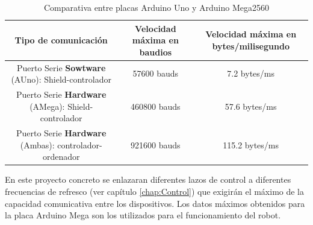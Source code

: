 	 \begin{table}[H]
	 	\caption{Comparativa entre placas Arduino Uno y Arduino Mega2560}
	 	\label{tab:comunication_serial}
	 		\begin{center}
	 			\begin{tabular}{ |c|c|c| }
	 				\hline
	 				\textbf{Tipo de comunicación}& \begin{minipage}{.30\linewidth} \textbf{Velocidad máxima  en baudios}  \end{minipage}& \begin{minipage}{.30\linewidth} \textbf{Velocidad máxima en bytes/milisegundo} \end{minipage} \\
	 				\hline
	 				\begin{minipage}{.30\linewidth}\vspace{2pt} Puerto Serie \textbf{Sowtware} (AUno):  Shield-controlador \vspace{2pt} \end{minipage} & 57600 bauds & 7.2 bytes/ms \\
	 				\hline
	 				\begin{minipage}{.30\linewidth}\vspace{2pt} Puerto Serie \textbf{Hardware} (AMega):  Shield-controlador \vspace{2pt} \end{minipage} & 460800 bauds & 57.6 bytes/ms \\
	 				\hline
	 				\begin{minipage}{.30\linewidth}\vspace{2pt} Puerto Serie \textbf{Hardware} (Ambas):  controlador-ordenador \vspace{2pt} \end{minipage} & 921600 bauds & 115.2 bytes/ms \\
	 				\hline
	 			\end{tabular}
	 		\end{center}
	 \end{table}
	 
	 En este proyecto concreto se enlazaran diferentes lazos de control a diferentes frecuencias de refresco (ver capítulo \ref{chap:Control}) que exigirán el máximo de la capacidad comunicativa entre los dispositivos. Los datos máximos obtenidos para la placa Arduino Mega son los utilizados para el funcionamiento del robot.
	
